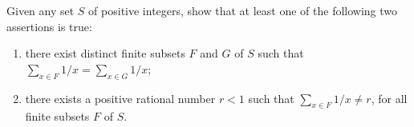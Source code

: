 Given any set $S$ of positive integers, show that at least one of the following two assertions is true:

\begin{enumerate}
	\item there exist distinct finite subsets $F$ and $G$ of $S$ such that $\sum_{x \in F} 1/x = \sum_{x \in G} 1/x$;

	\item there exists a positive rational number $r < 1$ such that $\sum_{x \in F} 1/x \neq r$, for all finite subsets $F$ of $S$.
\end{enumerate}
